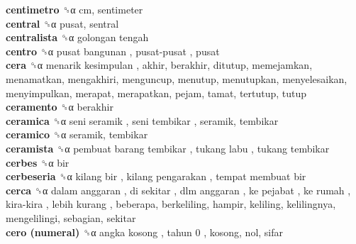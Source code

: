 \textbf{centimetro} ␝α  cm, sentimeter  \\
\textbf{central} ␝α  pusat, sentral  \\
\textbf{centralista} ␝α   golongan tengah   \\
\textbf{centro} ␝α   pusat bangunan ,  pusat-pusat , pusat  \\
\textbf{cera} ␝α   menarik kesimpulan , akhir, berakhir, ditutup, memejamkan, menamatkan, mengakhiri, menguncup, menutup, menutupkan, menyelesaikan, menyimpulkan, merapat, merapatkan, pejam, tamat, tertutup, tutup  \\
\textbf{ceramento} ␝α  berakhir  \\
\textbf{ceramica} ␝α   seni seramik ,  seni tembikar , seramik, tembikar  \\
\textbf{ceramico} ␝α  seramik, tembikar  \\
\textbf{ceramista} ␝α   pembuat barang tembikar ,  tukang labu ,  tukang tembikar   \\
\textbf{cerbes} ␝α  bir  \\
\textbf{cerbeseria} ␝α   kilang bir ,  kilang pengarakan ,  tempat membuat bir   \\
\textbf{cerca} ␝α   dalam anggaran ,  di sekitar ,  dlm anggaran ,  ke pejabat ,  ke rumah ,  kira-kira ,  lebih kurang , beberapa, berkeliling, hampir, keliling, kelilingnya, mengelilingi, sebagian, sekitar  \\
\textbf{cero (numeral)} ␝α   angka kosong ,  tahun 0 , kosong, nol, sifar  \\
